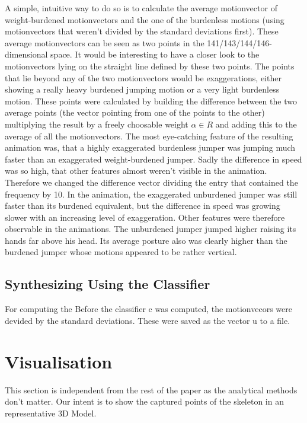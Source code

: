 \documentclass[a4paper]{article}
\begin{document}
A simple, intuitive way to do so is to calculate the average motionvector of weight-burdened motionvectors and the one of the burdenless motions (using motionvectors that weren't divided by the standard deviations first).
These average motionvectors can be seen as two points in the 141/143/144/146-dimensional space. It would be interesting to have a closer look to the motionvectors lying on the straight line defined by these two points.
The points that lie beyond any of the two motionvectors would be exaggerations, either showing a really heavy burdened jumping motion or a very light burdenless motion.
These points were calculated by building the difference between the two average points (the vector pointing from one of the points to the other) multiplying the result by a freely choosable weight $\alpha \in R$ and adding this to the average of all the motionvectors.
The most eye-catching feature of the resulting animation was, that a highly exaggerated burdenless jumper was jumping much faster than an exaggerated weight-burdened jumper.
Sadly the difference in speed was so high, that other features almost weren't visible in the animation.
Therefore we changed the difference vector dividing the entry that contained the frequency by 10.
In the animation, the exaggerated unburdened jumper was still faster than its burdened equivalent, but the difference in speed was growing slower with an increasing level of exaggeration.
Other features were therefore observable in the animations.
The unburdened jumper jumped higher raising its hands far above his head.
Its average posture also was clearly higher than the burdened jumper whose motions appeared to be rather vertical.

\subsection{Synthesizing Using the Classifier}

For computing the 
Before the classifier c was computed, the motionvecors were devided by the standard deviations. These were saved as the vector u to a file.

\section{Visualisation}

This section is independent from the rest of the paper as the analytical methods don't matter.
Our intent is to show the captured points of the skeleton in an representative 3D Model.
\end{document}
